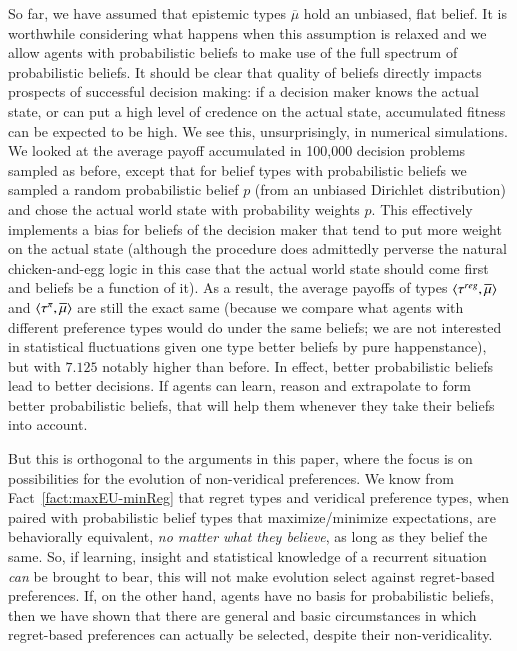 \documentclass[fleqn,reqno,11pt]{article}
\begin{document}
So far, we have assumed that epistemic types $\overline{\mu}$ hold an unbiased, flat belief. It is
worthwhile considering what happens when this assumption is relaxed and we allow agents with
probabilistic beliefs to make use of the full spectrum of probabilistic beliefs. It should be
clear that quality of beliefs directly impacts prospects of successful decision making: if a
decision maker knows the actual state, or can put a high level of credence on the actual state,
accumulated fitness can be expected to be high. We see this, unsurprisingly, in numerical
simulations. We looked at the average payoff accumulated in 100,000 decision problems sampled
as before, except that for belief types with probabilistic beliefs we sampled a random
probabilistic belief $p$ (from an unbiased Dirichlet distribution) and chose the actual world
state with probability weights $p$. This effectively implements a bias for beliefs of the
decision maker that tend to put more weight on the actual state (although the procedure does
admittedly perverse the natural chicken-and-egg logic in this case that the actual world state
should come first and beliefs be a function of it). As a result, the average payoffs of types
$\left \langle \tau^{reg}, \overline{\mu}\right\rangle$ and $\left \langle \tau^{\pi}, \overline{\mu}\right\rangle$ are still the exact same
(because we compare what agents with different preference types would do under the same
beliefs; we are not interested in statistical fluctuations given one type better beliefs by
pure happenstance), but with $7.125$ notably higher than before. In effect, better
probabilistic beliefs lead to better decisions. If agents can learn, reason and extrapolate to
form better probabilistic beliefs, that will help them whenever they take their beliefs into
account. 

But this is orthogonal to the arguments in this paper, where the focus is on possibilities for
the evolution of non-veridical preferences. We know from Fact~\ref{fact:maxEU-minReg} that
regret types and veridical preference types, when paired with probabilistic belief types that
maximize/minimize expectations, are behaviorally equivalent, \emph{no matter what they believe},
as long as they belief the same. So, if learning, insight and statistical knowledge of a
recurrent situation \emph{can} be brought to bear, this will not make evolution select against
regret-based preferences. If, on the other hand, agents have no basis for probabilistic
beliefs, then we have shown that there are general and basic circumstances in which
regret-based preferences can actually be selected, despite their non-veridicality.
\fi
\end{document}
